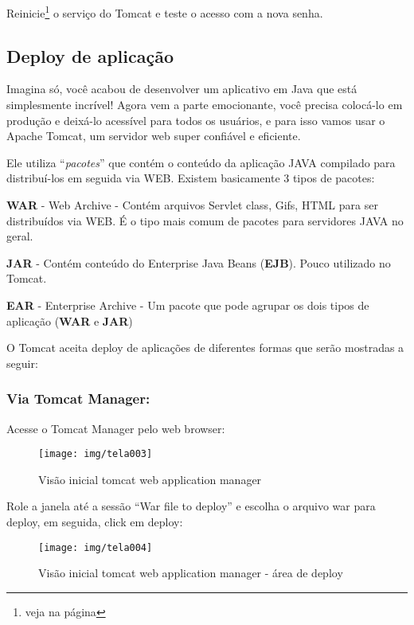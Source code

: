 Reinicie\footnote{ veja na página \pageref{restartTomcat}} o serviço do Tomcat e teste o acesso com a nova senha.

\subsection{Deploy de aplicação}

Imagina só, você acabou de desenvolver um aplicativo em Java que está simplesmente incrível! Agora vem a parte emocionante, você precisa colocá-lo em produção e deixá-lo acessível para todos os usuários, e para isso vamos usar o Apache Tomcat, um servidor web super confiável e eficiente.

Ele utiliza “\emph{pacotes}” que contém o conteúdo da aplicação JAVA compilado para distribuí-los em seguida via WEB. Existem basicamente 3 tipos de pacotes:

\textbf{WAR} - Web Archive - Contém arquivos Servlet class, Gifs, HTML para ser distribuídos via WEB. É o tipo mais comum de pacotes para servidores JAVA no geral.

\textbf{JAR} - Contém conteúdo do Enterprise Java Beans (\textbf{EJB}). Pouco utilizado no Tomcat.

\textbf{EAR} - Enterprise Archive - Um pacote que pode agrupar os dois tipos de aplicação (\textbf{WAR} e \textbf{JAR})

\newpage
O Tomcat aceita deploy de aplicações de diferentes formas que serão mostradas a seguir: 


\subsubsection{Via Tomcat Manager:}

Acesse o Tomcat Manager pelo web browser:

\begin{figure}[H]
	\centering
	\caption[Tela Application Mangager]{Visão inicial tomcat web application manager}
	\texttt{[image: img/tela003]}
	\label{fig:tomcat-tela-appmanager}
\end{figure}

Role a janela até a sessão “War file to deploy” e escolha o arquivo war para deploy, em seguida, click em deploy:

\begin{figure}[H]
	\centering
	\caption[Tela Application Mangager - Deploy]{Visão inicial tomcat web application manager - área de deploy}
	\texttt{[image: img/tela004]}
	\label{fig:tomcat-tela-deploy}
\end{figure}

